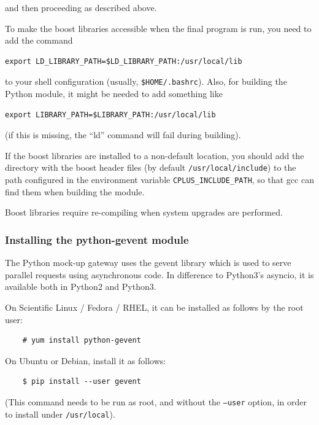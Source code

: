 \documentclass[11pt,a4paper]{scrartcl}
\begin{document}
  and then proceeding as described above.


To make the boost libraries accessible when the
final program is run, you need to add the
command

\begin{verbatim}
export LD_LIBRARY_PATH=$LD_LIBRARY_PATH:/usr/local/lib
\end{verbatim}

to your shell configuration (usually, \verb+$HOME/.bashrc+).
Also, for building the Python module, it might be needed
to add something like

\begin{verbatim}
export LIBRARY_PATH=$LIBRARY_PATH:/usr/local/lib
\end{verbatim}
(if this is missing, the ``ld'' command will fail during building).



If the boost libraries are installed to a non-default location, you
should add the directory with the boost header files (by default
\verb+/usr/local/include+) to the path configured in the environment
variable \verb+CPLUS_INCLUDE_PATH+, so that gcc can find them when
building the module.

Boost libraries require re-compiling when system upgrades are
performed.

\subsubsection{Installing the python-gevent module}
The Python mock-up gateway uses the gevent
library which is used to serve parallel requests
using asynchronous code. In difference to
Python3's asyncio, it is available both in
Python2 and Python3.

On Scientific Linux / Fedora / RHEL, it can be installed
as follows by the root user:

  \begin{verbatim}
    # yum install python-gevent
  \end{verbatim}    


On Ubuntu or Debian, install it as follows:

  \begin{verbatim}
    $ pip install --user gevent
  \end{verbatim}    

(This command needs to be run as root, and without the \texttt{--user}
  option, in order to install under \texttt{/usr/local}).
\end{document}
